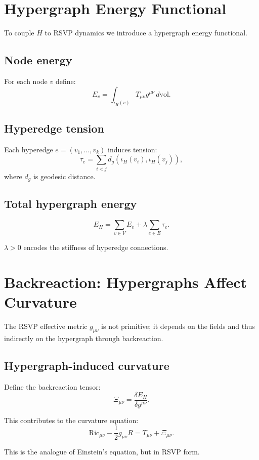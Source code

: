 \section{Hypergraph Energy Functional}

To couple $H$ to RSVP dynamics we introduce a hypergraph energy functional.

\subsection{Node energy}

For each node $v$ define:
\[
E_v
=
\int_{\iota_H(v)}
T_{\mu\nu} g^{\mu\nu}\, d\mathrm{vol}.
\]

\subsection{Hyperedge tension}

Each hyperedge $e=(v_1,\dots,v_k)$ induces tension:
\[
\tau_e
=
\sum_{i<j}
d_g\!\left(\iota_H(v_i),\iota_H(v_j)\right),
\]
where $d_g$ is geodesic distance.

\subsection{Total hypergraph energy}

\[
E_H
=
\sum_{v\in V} E_v
+
\lambda\sum_{e\in E}\tau_e.
\]

$\lambda>0$ encodes the stiffness of hyperedge connections.

\section{Backreaction: Hypergraphs Affect Curvature}

The RSVP effective metric $g_{\mu\nu}$ is not primitive; it depends on the
fields and thus indirectly on the hypergraph through backreaction.

\subsection{Hypergraph-induced curvature}

Define the backreaction tensor:
\[
\Xi_{\mu\nu}
=
\frac{\delta E_H}{\delta g^{\mu\nu}}.
\]

This contributes to the curvature equation:
\[
\mathrm{Ric}_{\mu\nu}
-
\frac{1}{2}g_{\mu\nu}R
=
T_{\mu\nu}
+
\Xi_{\mu\nu}.
\]

This is the analogue of Einstein’s equation, but in RSVP form.

